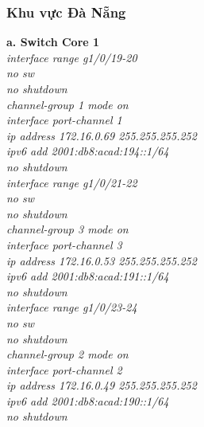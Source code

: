 \documentclass[12pt,a4paper]{report}
\begin{document}
\subsubsection{Khu vực Đà Nẵng}
\hspace*{1cm}\textbf{a. Switch Core 1}\\
\hspace*{2cm}\textit{interface range g1/0/19-20\\
\hspace*{2cm}no sw\\
\hspace*{2cm}no shutdown\\
\hspace*{2cm}channel-group 1 mode on \\
\hspace*{2cm}interface port-channel 1\\
\hspace*{2cm}ip address 172.16.0.69 255.255.255.252\\
\hspace*{2cm}ipv6 add 2001:db8:acad:194::1/64\\
\hspace*{2cm}no shutdown\\
\hspace*{2cm}interface range g1/0/21-22\\
\hspace*{2cm}no sw\\
\hspace*{2cm}no shutdown\\
\hspace*{2cm}channel-group 3 mode on \\
\hspace*{2cm}interface port-channel 3\\
\hspace*{2cm}ip address 172.16.0.53 255.255.255.252\\
\hspace*{2cm}ipv6 add 2001:db8:acad:191::1/64\\
\hspace*{2cm}no shutdown\\
\hspace*{2cm}interface range g1/0/23-24\\
\hspace*{2cm}no sw\\
\hspace*{2cm}no shutdown\\
\hspace*{2cm}channel-group 2 mode on \\
\hspace*{2cm}interface port-channel 2\\
\hspace*{2cm}ip address 172.16.0.49 255.255.255.252\\
\hspace*{2cm}ipv6 add 2001:db8:acad:190::1/64\\
\hspace*{2cm}no shutdown\\}
\end{document}
